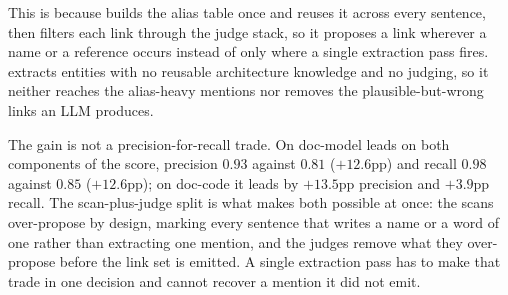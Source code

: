 This is because \approach{} builds the alias table once and reuses it across every sentence, then filters each link through the judge stack, so it proposes a link wherever a name or a reference occurs instead of only where a single extraction pass fires.
\Artemis{} extracts entities with no reusable architecture knowledge and no judging, so it neither reaches the alias-heavy mentions nor removes the plausible-but-wrong links an \ac{LLM} produces.

The gain is not a precision-for-recall trade.
On doc-model \approach{} leads on both components of the score, precision $0.93$ against $0.81$ ($+12.6$pp) and recall $0.98$ against $0.85$ ($+12.6$pp); on doc-code it leads by $+13.5$pp precision and $+3.9$pp recall.
The scan-plus-judge split is what makes both possible at once: the scans over-propose by design, marking every sentence that writes a name or a word of one rather than extracting one mention, and the judges remove what they over-propose before the link set is emitted.
A single extraction pass has to make that trade in one decision and cannot recover a mention it did not emit.


